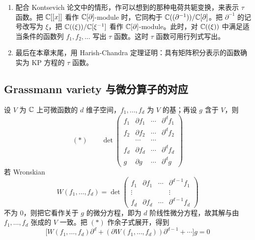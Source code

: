 \begin{enumerate}[label=\arabic*.,leftmargin=2.4em,itemsep=5pt,topsep=5pt]
\item 配合 Kontsevich 论文中的情形，作可以想到的那种电荷共轭变换，来表示 $\tau$ 函数。把 $\mathbb{C}[[x]]$ 看作 $\mathbb{C}[\partial]$-module 时，它同构于 $\mathbb{C}((\partial^{-1}))/\mathbb{C}[\partial]$。把 $\partial^{-1}$ 的记号改写为 $\xi$，把 $\mathbb{C}((\xi))/\mathbb{C}[\xi^{-1}]$ 看作 $\mathbb{C}[\partial]$-module。此时，对 $\mathbb{C}((\xi))$ 中满足适当条件的函数列 $f_1,f_2,\dots$ 写出 $\tau$ 函数。这时 $\tau$ 函数可用行列式写出。

\item 最后在本章末尾，用 Harish-Chandra 定理证明：具有矩阵积分表示的函数确实为 KP 方程的 $\tau$ 函数。
\end{enumerate}



\subsection{Grassmann variety 与微分算子的对应}

设 $V$ 为 $\mathbb{C}$ 上可微函数的 $d$ 维子空间，$f_1,\dots,f_d$ 为 $V$ 的基；再设 $g$ 含于 $V$，则
\[
(*)\qquad
\det
\begin{pmatrix}
f_1 & \partial f_1 & \cdots & \partial^d f_1\\
f_2 & \partial f_2 & \cdots & \partial^d f_2\\
 & \cdots & \cdots & \\
f_d & \partial f_d & \cdots & \partial^d f_d\\
g & \partial g & \cdots & \partial^d g
\end{pmatrix}
\]
若 Wronskian
\[
W(f_1,\dots,f_d)=\det
\begin{pmatrix}
f_1 & \partial f_1 & \cdots & \partial^{d-1}f_1\\
\vdots & & & \vdots\\
f_d & \partial f_d & \cdots & \partial^{d-1}f_d
\end{pmatrix}
\]
不为 $0$，则把它看作关于 $g$ 的微分方程，即为 $d$ 阶线性微分方程，故其解与由 $f_1,\dots,f_d$ 张成的 $V$ 一致。把 $(*)$ 作余子式展开，得到
\[
\bigl[W(f_1,\dots,f_d)\partial^d+(\partial W(f_1,\dots,f_d))\partial^{d-1}+\cdots\bigr]g=0
\]

